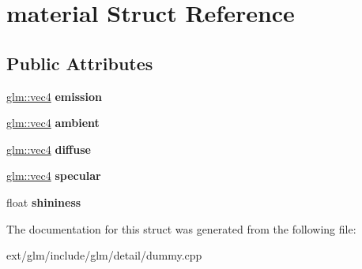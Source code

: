 \hypertarget{structmaterial}{\section{material Struct Reference}
\label{structmaterial}
}
\subsection*{Public Attributes}
\begin{DoxyCompactItemize}
\item 
\hypertarget{structmaterial_a76b696726a2ea73e6840001821942bc3}{\hyperlink{group__core__types_ga5881b1b022d7fd1b7218f5916532dd02}{glm\-::vec4} {\bfseries emission}}\label{structmaterial_a76b696726a2ea73e6840001821942bc3}

\item 
\hypertarget{structmaterial_a944296102e90b1610967530458f40ba1}{\hyperlink{group__core__types_ga5881b1b022d7fd1b7218f5916532dd02}{glm\-::vec4} {\bfseries ambient}}\label{structmaterial_a944296102e90b1610967530458f40ba1}

\item 
\hypertarget{structmaterial_a506a0cc33282fa76872c6aeebd688b39}{\hyperlink{group__core__types_ga5881b1b022d7fd1b7218f5916532dd02}{glm\-::vec4} {\bfseries diffuse}}\label{structmaterial_a506a0cc33282fa76872c6aeebd688b39}

\item 
\hypertarget{structmaterial_a452d07b4570da7204caeaf798cd01a77}{\hyperlink{group__core__types_ga5881b1b022d7fd1b7218f5916532dd02}{glm\-::vec4} {\bfseries specular}}\label{structmaterial_a452d07b4570da7204caeaf798cd01a77}

\item 
\hypertarget{structmaterial_aa3740fd7908ec5a11bbc4a4bd5b21abc}{float {\bfseries shininess}}\label{structmaterial_aa3740fd7908ec5a11bbc4a4bd5b21abc}

\end{DoxyCompactItemize}


The documentation for this struct was generated from the following file\-:\begin{DoxyCompactItemize}
\item 
ext/glm/include/glm/detail/dummy.\-cpp\end{DoxyCompactItemize}
